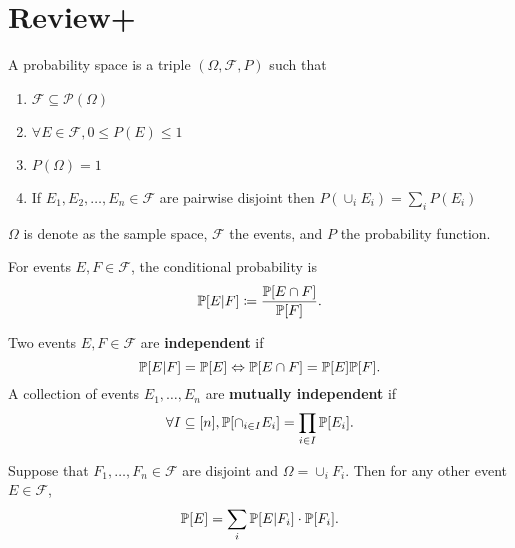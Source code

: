 \documentclass{subfiles}
\begin{document}
\chapter{Review+}

\begin{definition}
    A probability space is a triple $(\Omega, \mathcal{F}, P)$ such that
    \begin{enumerate}
        \item $\mathcal{F} \subseteq \mathcal{P}(\Omega)$
        \item $\forall E \in \mathcal{F}, 0 \leq P(E) \leq 1$
        \item $P(\Omega) = 1$
        \item If $E_1, E_2, \ldots, E_n \in \mathcal{F}$ are pairwise disjoint then $\displaystyle P(\cup_i E_i) = \sum_i P(E_i)$
    \end{enumerate}
    $\Omega$ is denote as the sample space, $\mathcal{F}$ the events, and $P$ the probability function.
\end{definition}

\begin{definition}
    For events $E, F \in \mathcal{F}$, the conditional probability is
    \[
        \mathbb{P}\qty[E | F] \coloneq \frac{\mathbb{P}\qty[E \cap F]}{\mathbb{P}\qty[F]}
    .\]
\end{definition}

\begin{definition}[Independence]
    Two events $E,F \in \mathcal{F}$ are \textbf{independent} if 
    \[
     \mathbb{P}\qty[E | F] = \mathbb{P}\qty[E] \Leftrightarrow \mathbb{P}\qty[E \cap F] = \mathbb{P}\qty[E] \mathbb{P}\qty[F]
    .\]
    A collection of events $E_1, \ldots, E_n$ are \textbf{mutually independent} if
    \[
        \forall I \subseteq [n], \mathbb{P}\qty[\cap_{i \in I} E_i] = \prod_{i \in I} \mathbb{P}\qty[E_i]
    .\]
\end{definition}

\begin{theorem}
    \label{thm:totalprobability}
    Suppose that $F_1, \ldots, F_n \in \mathcal{F}$ are disjoint and $\Omega = \cup_{i} F_i$. Then for any other event $E \in \mathcal{F}$,
    \[
        \mathbb{P}\qty[E] = \sum_{i} \mathbb{P}\qty[E | F_i] \cdot \mathbb{P}\qty[F_i]
    .\]
\end{theorem}
\end{document}
